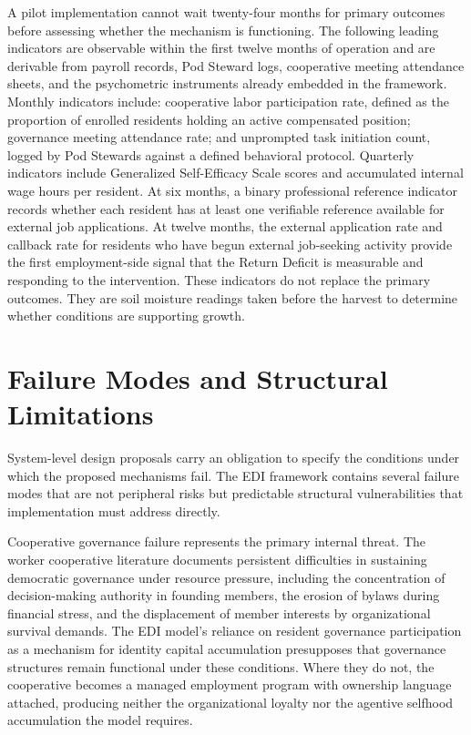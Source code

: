 \documentclass[12pt, letterpaper]{article}
\begin{document}
A pilot implementation cannot wait twenty-four months for primary outcomes before assessing whether the mechanism is functioning. The following leading indicators are observable within the first twelve months of operation and are derivable from payroll records, Pod Steward logs, cooperative meeting attendance sheets, and the psychometric instruments already embedded in the framework. Monthly indicators include: cooperative labor participation rate, defined as the proportion of enrolled residents holding an active compensated position; governance meeting attendance rate; and unprompted task initiation count, logged by Pod Stewards against a defined behavioral protocol. Quarterly indicators include Generalized Self-Efficacy Scale scores and accumulated internal wage hours per resident. At six months, a binary professional reference indicator records whether each resident has at least one verifiable reference available for external job applications. At twelve months, the external application rate and callback rate for residents who have begun external job-seeking activity provide the first employment-side signal that the Return Deficit is measurable and responding to the intervention. These indicators do not replace the primary outcomes. They are soil moisture readings taken before the harvest to determine whether conditions are supporting growth.

\section{Failure Modes and Structural Limitations}

System-level design proposals carry an obligation to specify the conditions under which the proposed mechanisms fail. The EDI framework contains several failure modes that are not peripheral risks but predictable structural vulnerabilities that implementation must address directly.

Cooperative governance failure represents the primary internal threat. The worker cooperative literature documents persistent difficulties in sustaining democratic governance under resource pressure, including the concentration of decision-making authority in founding members, the erosion of bylaws during financial stress, and the displacement of member interests by organizational survival demands. The EDI model's reliance on resident governance participation as a mechanism for identity capital accumulation presupposes that governance structures remain functional under these conditions. Where they do not, the cooperative becomes a managed employment program with ownership language attached, producing neither the organizational loyalty nor the agentive selfhood accumulation the model requires.
\end{document}
